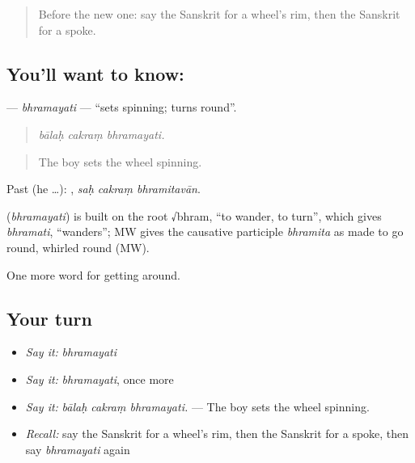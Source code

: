 \begin{quote}
Before the new one: say the Sanskrit for a wheel's rim, then the Sanskrit for a spoke.
\end{quote}

\subsection*{You'll want to know: }
\textbf{} — \emph{bhramayati} — \textquotedblleft{}sets spinning; turns round\textquotedblright{}.

\begin{quote}
  
\end{quote}

\begin{quote}
\emph{bālaḥ cakraṃ bhramayati.}
\end{quote}

\begin{quote}
The boy sets the wheel spinning.
\end{quote}

Past (he …):   , \emph{saḥ cakraṃ bhramitavān}.

\begin{cousinweb}
\textbf{} (\emph{bhramayati}) is built on the root √bhram, \textquotedblleft{}to wander, to turn\textquotedblright{}, which gives \emph{bhramati}, \textquotedblleft{}wanders\textquotedblright{}; MW gives the causative participle \emph{bhramita} as made to go round, whirled round (MW).
\end{cousinweb}

\begin{grammarlens}[title={What you've built}]
One more word for getting around.
\end{grammarlens}

\subsection*{Your turn}
\begin{itemize}
\raggedright
  \item \emph{Say it:} \emph{bhramayati}
  \item \emph{Say it:} \emph{bhramayati}, once more
  \item \emph{Say it:} \emph{bālaḥ cakraṃ bhramayati.} — The boy sets the wheel spinning.
  \item \emph{Recall:} say the Sanskrit for a wheel's rim, then the Sanskrit for a spoke, then say \emph{bhramayati} again
\end{itemize}

